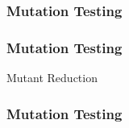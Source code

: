   \begin{frame}
    \frametitle{Mutation Testing}
    \centering
    
  \end{frame}


  \begin{frame}
    \frametitle{Mutation Testing}
    \centering
    {\fontsize{40}{40}\selectfont{\textcolor{solarizedViolet}{Retrospective}} Mutant Reduction}
  \end{frame}

  \begin{frame}
    \frametitle{Mutation Testing}
    \centering
    {\fontsize{40}{40}}
  \end{frame}
